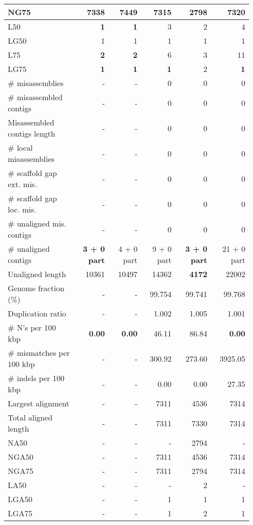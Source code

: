 \documentclass[12pt,a4paper]{article}
\begin{document}
\begin{table}[ht]
\begin{center}
\begin{tabular}{|l*{5}{|r}|}
NG75 & 7338 & {\bf 7449} & 7315 & 2798 & 7320 \\ \hline
L50 & {\bf 1} & {\bf 1} & 3 & 2 & 4 \\ \hline
LG50 & 1 & 1 & 1 & 1 & 1 \\ \hline
L75 & {\bf 2} & {\bf 2} & 6 & 3 & 11 \\ \hline
LG75 & {\bf 1} & {\bf 1} & {\bf 1} & 2 & {\bf 1} \\ \hline
\# misassemblies & - & - & 0 & 0 & 0 \\ \hline
\# misassembled contigs & - & - & 0 & 0 & 0 \\ \hline
Misassembled contigs length & - & - & 0 & 0 & 0 \\ \hline
\# local misassemblies & - & - & 0 & 0 & 0 \\ \hline
\# scaffold gap ext. mis. & - & - & 0 & 0 & 0 \\ \hline
\# scaffold gap loc. mis. & - & - & 0 & 0 & 0 \\ \hline
\# unaligned mis. contigs & - & - & 0 & 0 & 0 \\ \hline
\# unaligned contigs & {\bf 3 + 0 part} & 4 + 0 part & 9 + 0 part & {\bf 3 + 0 part} & 21 + 0 part \\ \hline
Unaligned length & 10361 & 10497 & 14362 & {\bf 4172} & 22002 \\ \hline
Genome fraction (\%) & - & - & 99.754 & 99.741 & 99.768 \\ \hline
Duplication ratio & - & - & 1.002 & 1.005 & 1.001 \\ \hline
\# N's per 100 kbp & {\bf 0.00} & {\bf 0.00} & 46.11 & 86.84 & {\bf 0.00} \\ \hline
\# mismatches per 100 kbp & - & - & 300.92 & 273.60 & 3925.05 \\ \hline
\# indels per 100 kbp & - & - & 0.00 & 0.00 & 27.35 \\ \hline
Largest alignment & - & - & 7311 & 4536 & 7314 \\ \hline
Total aligned length & - & - & 7311 & 7330 & 7314 \\ \hline
NA50 & - & - & - & 2794 & - \\ \hline
NGA50 & - & - & 7311 & 4536 & 7314 \\ \hline
NGA75 & - & - & 7311 & 2794 & 7314 \\ \hline
LA50 & - & - & - & 2 & - \\ \hline
LGA50 & - & - & 1 & 1 & 1 \\ \hline
LGA75 & - & - & 1 & 2 & 1 \\ \hline
\end{tabular}
\end{center}
\end{table}
\end{document}
